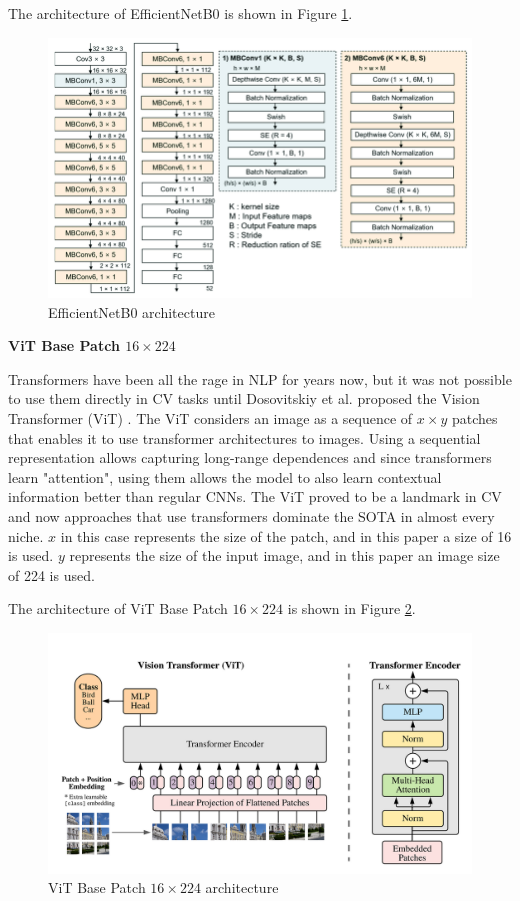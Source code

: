 The architecture of EfficientNetB0 is shown in Figure \ref{fig:efficientnetb0}.
\begin{figure}[!htb]
    \centering
    \includegraphics[width=.6\linewidth]{images/effnetarch.png}
    \caption{EfficientNetB0 architecture}
    \label{fig:efficientnetb0}
\end{figure}


\textbf{ViT Base Patch $16 \times 224$}

Transformers have been all the rage in NLP for years now, but it was not possible to use them directly in CV tasks until Dosovitskiy et al. proposed the Vision Transformer (ViT) \cite{dosovitskiyImageWorth16x162021}. The ViT considers an image as a sequence of $x \times y$ patches that enables it to use transformer architectures to images. Using a sequential representation allows capturing long-range dependences and since transformers learn "attention", using them allows the model to also learn contextual information better than regular CNNs. The ViT proved to be a landmark in CV and now approaches that use transformers dominate the SOTA in almost every niche. $x$ in this case represents the size of the patch, and in this paper a size of 16 is used. $y$ represents the size of the input image, and in this paper an image size of 224 is used. 

The architecture of ViT Base Patch $16 \times 224$ is shown in Figure \ref{fig:vit}.
\begin{figure}[!htb]
    \centering
    \includegraphics[width=.6\linewidth]{images/vitarch.png}
    \caption{ViT Base Patch $16 \times 224$ architecture}
    \label{fig:vit}
\end{figure}


